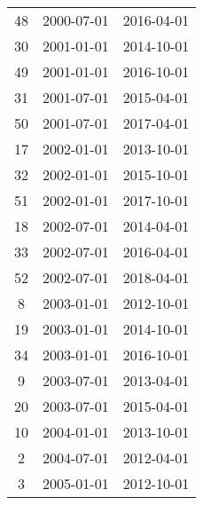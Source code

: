 \begin{tabular}{ccc}
  48 & 2000-07-01 & 2016-04-01 \\ 
  30 & 2001-01-01 & 2014-10-01 \\ 
  49 & 2001-01-01 & 2016-10-01 \\ 
  31 & 2001-07-01 & 2015-04-01 \\ 
  50 & 2001-07-01 & 2017-04-01 \\ 
  17 & 2002-01-01 & 2013-10-01 \\ 
  32 & 2002-01-01 & 2015-10-01 \\ 
  51 & 2002-01-01 & 2017-10-01 \\ 
  18 & 2002-07-01 & 2014-04-01 \\ 
  33 & 2002-07-01 & 2016-04-01 \\ 
  52 & 2002-07-01 & 2018-04-01 \\ 
  8 & 2003-01-01 & 2012-10-01 \\ 
  19 & 2003-01-01 & 2014-10-01 \\ 
  34 & 2003-01-01 & 2016-10-01 \\ 
  9 & 2003-07-01 & 2013-04-01 \\ 
  20 & 2003-07-01 & 2015-04-01 \\ 
  10 & 2004-01-01 & 2013-10-01 \\ 
  2 & 2004-07-01 & 2012-04-01 \\ 
  3 & 2005-01-01 & 2012-10-01 \\ 
   \hline
\end{tabular}
